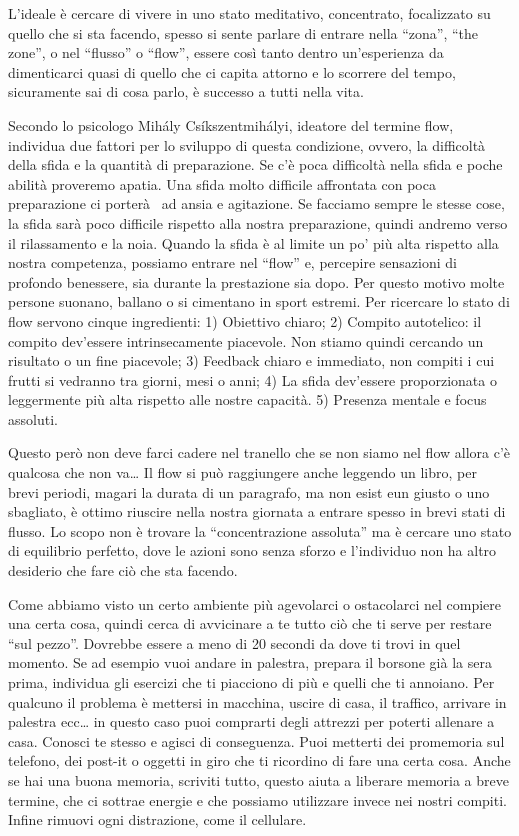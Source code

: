 \documentclass[12pt]{book} %
\begin{document}
\begin{mdframed}[linewidth=1pt]
L'ideale è cercare di vivere in uno stato meditativo, concentrato, focalizzato su quello che si sta
facendo, spesso si sente parlare di entrare nella “zona”, “the zone”, o nel “flusso” o “flow”, essere così tanto dentro
un'esperienza da dimenticarci quasi di quello che ci capita attorno e lo scorrere del tempo,
sicuramente sai di cosa parlo, è successo a tutti nella vita.

Secondo lo psicologo Mihály Csíkszentmihályi, ideatore del termine flow, individua due fattori per lo sviluppo di questa
condizione, ovvero, la difficoltà della sfida e la quantità di preparazione. Se c'è poca
difficoltà nella sfida e poche abilità proveremo apatia. Una sfida molto difficile affrontata con poca preparazione ci
porterà \ ad ansia e agitazione. Se facciamo sempre le stesse cose, la sfida sarà poco difficile rispetto alla nostra
preparazione, quindi andremo verso il rilassamento e la noia. Quando la sfida è al limite un po'
più alta rispetto alla nostra competenza, possiamo entrare nel “flow” e, percepire sensazioni di profondo benessere,
sia durante la prestazione sia dopo. Per questo motivo molte persone suonano, ballano o si cimentano in sport estremi.
Per ricercare lo stato di flow servono cinque ingredienti: 1) Obiettivo chiaro; 2) Compito autotelico: il compito
dev'essere intrinsecamente piacevole. Non stiamo quindi cercando un risultato o un fine piacevole;
3) Feedback chiaro e immediato, non compiti i cui frutti si vedranno tra giorni, mesi o anni; 4) La sfida
dev'essere proporzionata o leggermente più alta rispetto alle nostre capacità. 5) Presenza mentale
e focus assoluti.

Questo però non deve farci cadere nel tranello che se non siamo nel flow allora c'è qualcosa che non va… Il flow si può
raggiungere anche leggendo un libro, per brevi periodi, magari la durata di un paragrafo, ma non esist eun giusto o uno
sbagliato, è ottimo riuscire nella nostra giornata a entrare spesso in brevi stati di flusso. Lo scopo non è trovare la
“concentrazione assoluta” ma è cercare uno stato di equilibrio perfetto, dove le azioni sono senza sforzo e
l'individuo non ha altro desiderio che fare ciò che sta facendo.

Come abbiamo visto un certo ambiente più agevolarci o ostacolarci nel compiere una certa cosa, quindi cerca di
avvicinare a te tutto ciò che ti serve per restare “sul pezzo”. Dovrebbe essere a meno di 20 secondi da dove ti trovi
in quel momento. Se ad esempio vuoi andare in palestra, prepara il borsone già la sera prima, individua gli esercizi
che ti piacciono di più e quelli che ti annoiano. Per qualcuno il problema è mettersi in macchina, uscire di casa, il
traffico, arrivare in palestra ecc… in questo caso puoi comprarti degli attrezzi per poterti allenare a casa. Conosci
te stesso e agisci di conseguenza. Puoi metterti dei promemoria sul telefono, dei post-it o oggetti in giro che ti
ricordino di fare una certa cosa. Anche se hai una buona memoria, scriviti tutto, questo aiuta a liberare memoria a
breve termine, che ci sottrae energie e che possiamo utilizzare invece nei nostri compiti. Infine rimuovi ogni
distrazione, come il cellulare.


\end{mdframed}
\end{document}
